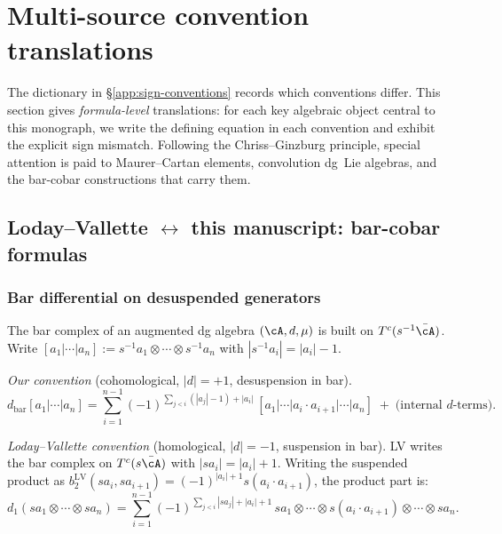 
\section{Multi-source convention translations}
\label{sec:multi-source-translations}

The dictionary in \S\ref{app:sign-conventions} records which conventions differ.
This section gives \emph{formula-level} translations: for each key algebraic
object central to this monograph, we write the defining equation in each
convention and exhibit the explicit sign mismatch. Following the
Chriss--Ginzburg principle, special attention is paid to Maurer--Cartan
elements, convolution dg~Lie algebras, and the bar-cobar constructions that
carry them.

\subsection{Loday--Vallette $\leftrightarrow$ this manuscript: bar-cobar formulas}
\label{sec:lv-us-formulas}

\subsubsection{Bar differential on desuspended generators}

The bar complex of an augmented dg algebra $(\cA, d, \mu)$ is built on
$T^c(s^{-1}\bar{\cA})$. Write $[a_1|\cdots|a_n] := s^{-1}a_1\otimes\cdots\otimes s^{-1}a_n$
with $|s^{-1}a_i| = |a_i| - 1$.

\emph{Our convention} (cohomological, $|d|=+1$, desuspension in bar).
\begin{equation}\label{eq:bar-diff-us}
d_{\mathrm{bar}}[a_1|\cdots|a_n]
= \sum_{i=1}^{n-1}
(-1)^{\sum_{j<i}(|a_j|-1)+|a_i|}\,
 [a_1|\cdots|a_i \cdot a_{i+1}|\cdots|a_n]
\;+\; \text{(internal $d$-terms)}.
\end{equation}

\emph{Loday--Vallette convention} (homological, $|d|=-1$, suspension in bar).
LV writes the bar complex on $T^c(s\bar{\cA})$ with $|sa_i| = |a_i|+1$.
Writing the suspended product as
$b^{\mathrm{LV}}_2(sa_i,sa_{i+1})=(-1)^{|a_i|+1}s(a_i\cdot a_{i+1})$,
the product part is:
\begin{equation}\label{eq:bar-diff-lv}
d_1(sa_1\otimes\cdots\otimes sa_n)
= \sum_{i=1}^{n-1} (-1)^{\sum_{j<i}|sa_j|+|a_i|+1}\,
 sa_1\otimes\cdots\otimes s(a_i \cdot a_{i+1})\otimes\cdots\otimes sa_n.
\end{equation}

